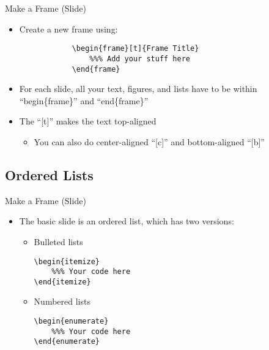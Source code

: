 \lstset{language=TeX}
\begin{frame}[fragile,t]{Make a Frame (Slide)}
	\begin{itemize}
		\item Create a new frame using:
		\begin{verbatim}
			\begin{frame}[t]{Frame Title}
				%%% Add your stuff here
			\end{frame}
		\end{verbatim}
\vspace{0.2in}
		\item For each slide, all your text, figures, and lists have to be within ``begin\{frame\}'' and ``end\{frame\}''
\vspace{0.2in}
		\item The ``[t]'' makes the text top-aligned
		\begin{itemize}
			\item You can also do center-aligned ``[c]'' and bottom-aligned ``[b]''
		\end{itemize}
	\end{itemize}
\end{frame}

\subsection{Ordered Lists}
\begin{frame}[fragile,t]{Make a Frame (Slide)}
	\begin{itemize}
		\item The basic slide is an ordered list, which has two versions:
		\begin{itemize}
			\item Bulleted lists
			\begin{lstlisting}
\begin{itemize}
	%%% Your code here
\end{itemize}
			\end{lstlisting}
\vspace{0.2in}
			\item Numbered lists
			\begin{lstlisting}
\begin{enumerate}
	%%% Your code here
\end{enumerate}
			\end{lstlisting}
		\end{itemize}
	\end{itemize}
\end{frame}

